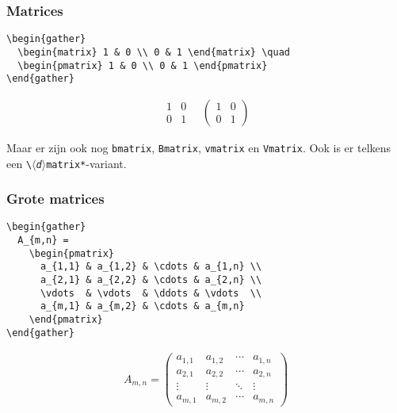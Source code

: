 \begin{frame}[fragile]
  \frametitle{Matrices}

  \begin{verbatim}
\begin{gather}
  \begin{matrix} 1 & 0 \\ 0 & 1 \end{matrix} \quad
  \begin{pmatrix} 1 & 0 \\ 0 & 1 \end{pmatrix}
\end{gather}
  \end{verbatim}
\begin{gather}
  \begin{matrix} 1 & 0 \\ 0 & 1 \end{matrix} \quad
  \begin{pmatrix} 1 & 0 \\ 0 & 1 \end{pmatrix}
\end{gather}

Maar er zijn ook nog \verb|bmatrix|, \verb|Bmatrix|, \verb|vmatrix| en \verb|Vmatrix|. Ook is er telkens een \texttt{\textbackslash\textsl{$\langle$d$\rangle$}matrix*}-variant.
\end{frame}

\begin{frame}[fragile]
  \frametitle{Grote matrices}
  
  \footnotesize
  \begin{verbatim}
\begin{gather}
  A_{m,n} =
    \begin{pmatrix}
      a_{1,1} & a_{1,2} & \cdots & a_{1,n} \\
      a_{2,1} & a_{2,2} & \cdots & a_{2,n} \\
      \vdots  & \vdots  & \ddots & \vdots  \\
      a_{m,1} & a_{m,2} & \cdots & a_{m,n}
    \end{pmatrix} 
\end{gather}
  \end{verbatim}
\begin{gather}
  A_{m,n} =
    \begin{pmatrix}
      a_{1,1} & a_{1,2} & \cdots & a_{1,n} \\
      a_{2,1} & a_{2,2} & \cdots & a_{2,n} \\
      \vdots  & \vdots  & \ddots & \vdots  \\
      a_{m,1} & a_{m,2} & \cdots & a_{m,n}
    \end{pmatrix} 
\end{gather}
\end{frame}

